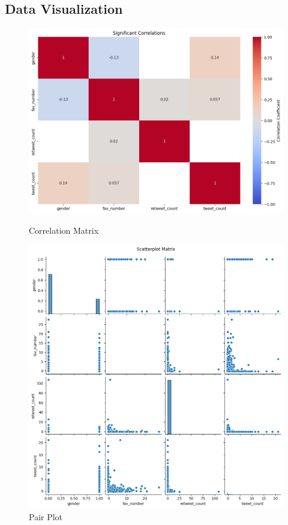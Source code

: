 \documentclass[a4paper,11pt]{article}
\begin{document}
\subsection{Data Visualization}

\begin{figure}[h!]
    \centering
    \begin{minipage}{0.45\textwidth}
        \centering
        \includegraphics[width=\textwidth]{corr_a2.png}
        \caption{Correlation Matrix}
        \label{fig:corr}
    \end{minipage}
    \hfill
    \begin{minipage}{0.45\textwidth}
        \centering
        \includegraphics[width=\textwidth]{pair_plot_a2.png}
        \caption{Pair Plot}
        \label{fig:p_plot}
    \end{minipage}
\end{figure}
\end{document}
